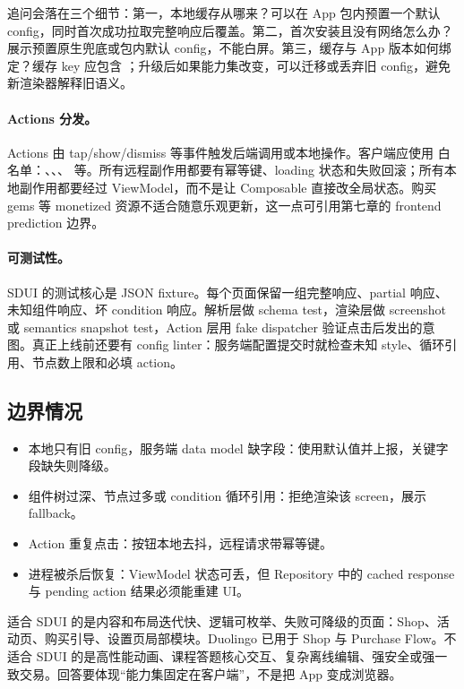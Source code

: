 追问会落在三个细节：第一，本地缓存从哪来？可以在 App 包内预置一个默认 config，同时首次成功拉取完整响应后覆盖。第二，首次安装且没有网络怎么办？展示预置原生兜底或包内默认 config，不能白屏。第三，缓存与 App 版本如何绑定？缓存 key 应包含 ；升级后如果能力集改变，可以迁移或丢弃旧 config，避免新渲染器解释旧语义。

\paragraph{Actions 分发。} \srcofficial Actions 由 tap/show/dismiss 等事件触发后端调用或本地操作。\srcinferred 客户端应使用  白名单：、、、 等。所有远程副作用都要有幂等键、loading 状态和失败回滚；所有本地副作用都要经过 ViewModel，而不是让 Composable 直接改全局状态。购买 gems 等 monetized 资源不适合随意乐观更新，这一点可引用第七章的 frontend prediction 边界。

\paragraph{可测试性。} SDUI 的测试核心是 JSON fixture。每个页面保留一组完整响应、partial 响应、未知组件响应、坏 condition 响应。解析层做 schema test，渲染层做 screenshot 或 semantics snapshot test，Action 层用 fake dispatcher 验证点击后发出的意图。\srcinferred 真正上线前还要有 config linter：服务端配置提交时就检查未知 style、循环引用、节点数上限和必填 action。

\subsection{边界情况}

\begin{itemize}
  \item 本地只有旧 config，服务端 data model 缺字段：使用默认值并上报，关键字段缺失则降级。
  \item 组件树过深、节点过多或 condition 循环引用：拒绝渲染该 screen，展示 fallback。
  \item Action 重复点击：按钮本地去抖，远程请求带幂等键。
  \item 进程被杀后恢复：ViewModel 状态可丢，但 Repository 中的 cached response 与 pending action 结果必须能重建 UI。
\end{itemize}

\begin{followup}
适合 SDUI 的是内容和布局迭代快、逻辑可枚举、失败可降级的页面：Shop、活动页、购买引导、设置页局部模块。\srcofficial Duolingo 已用于 Shop 与 Purchase Flow。\srcinferred 不适合 SDUI 的是高性能动画、课程答题核心交互、复杂离线编辑、强安全或强一致交易。回答要体现“能力集固定在客户端”，不是把 App 变成浏览器。
\end{followup}

